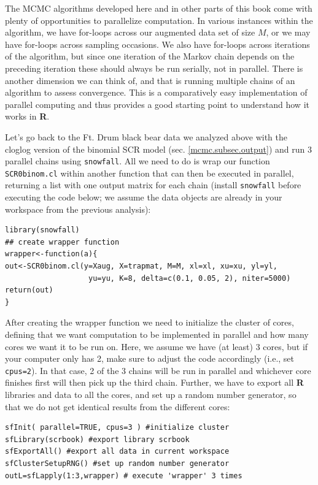 The MCMC algorithms developed here and in other parts of this book come with plenty of opportunities to parallelize computation. In various instances within the algorithm, we have for-loops across our augmented data set of size $M$, or we may have for-loops across sampling occasions. We also have for-loops across iterations of the algorithm, but since one iteration of the Markov chain depends on the preceding iteration these should always be run serially, not in parallel. There is another dimension we can think of, and that is running multiple chains of an algorithm to assess convergence. This is a comparatively easy implementation of parallel computing and thus provides a good starting point to understand how it works in {\bf R}.

Let's go back to the Ft. Drum black bear data we analyzed above with the cloglog version of the binomial SCR model (sec. \ref{mcmc.subsec.output}) and run 3 parallel chains using {\tt snowfall}. All we need to do is wrap our function {\tt SCR0binom.cl} within another function that can then be executed in parallel, returning a list with one output matrix for each chain (install {\tt snowfall} before executing the code below; we assume the data objects are already in your workspace from the previous analysis):

{\small
\begin{verbatim}
library(snowfall)
## create wrapper function
wrapper<-function(a){
out<-SCR0binom.cl(y=Xaug, X=trapmat, M=M, xl=xl, xu=xu, yl=yl,
                   yu=yu, K=8, delta=c(0.1, 0.05, 2), niter=5000)
return(out)
}
\end{verbatim}
}

After creating the wrapper function we need to initialize the cluster of cores, defining that we want computation to be implemented in parallel and how many cores we want it to be run on. Here, we assume we have (at least) 3 cores, but if your computer only has 2, make sure to adjust the code accordingly (i.e., set {\tt cpus=2}). In that case, 2 of the 3 chains will be run in parallel and whichever core finishes first will then pick up the third chain. Further, we have to export all {\bf R} libraries and data to all the cores, and set up a random number generator, so that we do not get identical results from the different cores:

{\small
\begin{verbatim}
sfInit( parallel=TRUE, cpus=3 ) #initialize cluster
sfLibrary(scrbook) #export library scrbook
sfExportAll() #export all data in current workspace
sfClusterSetupRNG() #set up random number generator
outL=sfLapply(1:3,wrapper) # execute 'wrapper' 3 times
\end{verbatim}
}


